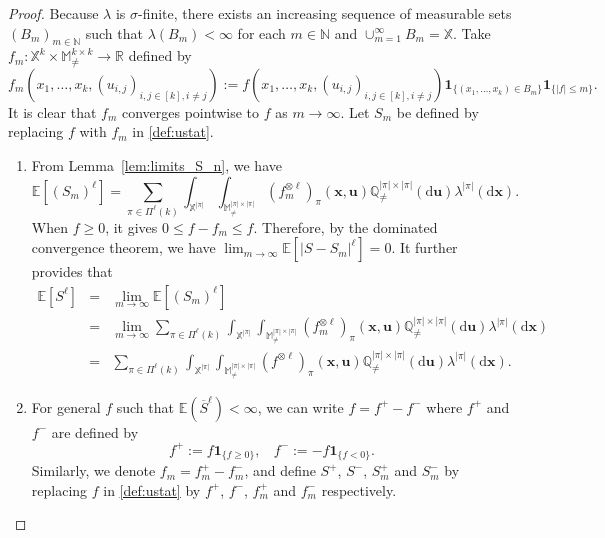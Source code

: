 \documentclass{article}
\theoremstyle{definition}
\numberwithin{equation}{section}
\theoremstyle{remark}
\newcommand{\E}{\mathbb{E}}
\begin{document}
\begin{proof}
Because $\lambda$ is $\sigma$-finite, 
there exists an increasing sequence of measurable sets $(B_m)_{m\in\mathbb{N}}$ such that $\lambda(B_m)<\infty$ for each $m\in\mathbb{N}$ and $ \cup_{m=1}^\infty B_m=\mathbb{X}$. Take $f_m:\mathbb{X}^k\times \mathbb{M}^{k\times k}_{\neq}\to\mathbb{R}$ defined by 
\begin{equation*}
f_m(x_1,\ldots,x_k, (u_{i,j})_{i,j\in[k], i\neq j}):=f(x_1,\ldots,x_k, (u_{i,j})_{i,j\in[k], i\neq j})\mathbf{1}_{\{(x_1,\ldots,x_k)\in B_m\}}\mathbf{1}_{\{|f|\le m\}}.
\end{equation*}
It is clear that $f_m$ converges pointwise to $f$ as $m\to\infty$.
Let $S_m$ be defined by replacing $f$ with $f_m$ in \eqref{def:ustat}. 
\begin{enumerate}
\item[1)] 
From Lemma~\ref{lem:limits_S_n}, we have 
\begin{equation}
    \E[(S_m)^\ell]=\sum_{\pi\in\Pi^\ell(k)}\int_{\mathbb{X}^{|\pi|}}\int_{\mathbb{M}^{|\pi|\times|\pi|}_{\ne}}(f_m^{\otimes\ell})_{\pi}(\bm{x},\bm{u})\mathbb{Q}^{|\pi|\times|\pi|}_{\ne}(\mathrm{d}\bm{u})\lambda^{|\pi|}(\mathrm{d}\bm{x}).
\end{equation}
When $f\ge0$, it gives $0\le f-f_m\le f$. Therefore, by the dominated convergence theorem, we have $\lim_{m\to\infty}\E\left[\left|S-S_m\right|^{\ell}\right]=0$. It further provides that
\begin{eqnarray*}
    \E[S^\ell]&=&\lim_{m\to\infty}\E[(S_m)^\ell]\\
    &=&\lim_{m\to\infty}\sum_{\pi\in\Pi^\ell(k)}\int_{\mathbb{X}^{|\pi|}}\int_{\mathbb{M}^{|\pi|\times|\pi|}_{\ne}}(f_m^{\otimes\ell})_{\pi}(\bm{x},\bm{u})\mathbb{Q}^{|\pi|\times|\pi|}_{\ne}(\mathrm{d}\bm{u})\lambda^{|\pi|}(\mathrm{d}\bm{x})\\
    &=&\sum_{\pi\in\Pi^\ell(k)}\int_{\mathbb{X}^{|\pi|}}\int_{\mathbb{M}^{|\pi|\times|\pi|}_{\ne}}(f^{\otimes\ell})_{\pi}(\bm{x},\bm{u})\mathbb{Q}^{|\pi|\times|\pi|}_{\ne}(\mathrm{d}\bm{u})\lambda^{|\pi|}(\mathrm{d}\bm{x}).
\end{eqnarray*}
\item[2)] For general $f$ such that $\E\left(\overline{S}^{\ell}\right)<\infty$, we can write $f=f^+-f^-$ where $f^+$ and $f^-$ are defined by 
$$f^+:=f\mathbf{1}_{\{f\ge0\}},~~~~f^-:=-f\mathbf{1}_{\{f<0\}}.$$
Similarly, we denote $f_m=f_m^+-f_m^-$, and define $S^+$, $S^-$, $S^+_m$ and $S_m^-$ by replacing $f$ in \eqref{def:ustat} by $f^+$, $f^-$, $f_m^+$ and $f_m^-$ respectively.

\end{enumerate}
\end{proof}
\end{document}
